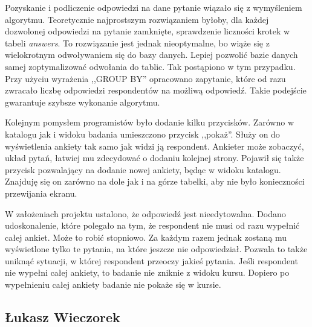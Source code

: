 Pozyskanie i podliczenie odpowiedzi na dane pytanie wiązało się z wymyśleniem algorytmu. Teoretycznie najprostszym rozwiązaniem byłoby, dla każdej dozwolonej odpowiedzi na pytanie zamknięte, sprawdzenie liczności krotek w tabeli \emph{answers}. To rozwiązanie jest jednak nieoptymalne, bo wiąże się z wielokrotnym odwoływaniem się do bazy danych. Lepiej pozwolić bazie danych samej zoptymalizować odwołania do tablic. Tak postąpiono w tym przypadku. Przy użyciu wyrażenia ,,GROUP BY'' opracowano zapytanie, które od razu zwracało liczbę odpowiedzi respondentów na możliwą odpowiedź. Takie podejście gwarantuje szybsze wykonanie algorytmu.

Kolejnym pomysłem programistów było dodanie kilku przycisków. Zarówno w katalogu jak i widoku badania umieszczono przycisk ,,pokaż''. Służy on do wyświetlenia ankiety tak samo jak widzi ją respondent. Ankieter może zobaczyć, układ pytań, łatwiej mu zdecydować o dodaniu kolejnej strony. Pojawił się także przycisk pozwalający na dodanie nowej ankiety, będąc w widoku katalogu. Znajduję się on zarówno na dole jak i na górze tabelki, aby nie było konieczności przewijania ekranu.

W założeniach projektu ustalono, że odpowiedź jest nieedytowalna. Dodano udoskonalenie, które polegało na tym, że respondent nie musi od razu wypełnić całej ankiet. Może to robić stopniowo. Za każdym razem jednak zostaną mu wyświetlone tylko te pytania, na które jeszcze nie odpowiedział. Pozwala to także uniknąć sytuacji, w której respondent przeoczy jakieś pytania. Jeśli respondent nie wypełni całej ankiety, to badanie nie zniknie z widoku kursu. Dopiero po wypełnieniu całej ankiety badanie nie pokaże się w kursie.

\subsection{Łukasz Wieczorek}
